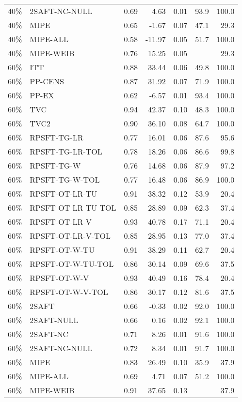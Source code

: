 \begin{table}[ht]
{\begin{tabular}{llrrrrr}
  40\% & 2SAFT-NC-NULL & 0.69 & 4.63 & 0.01 & 93.9 & 100.0 \\ 
  40\% & MIPE & 0.65 & -1.67 & 0.07 & 47.1 & 29.3 \\ 
  40\% & MIPE-ALL & 0.58 & -11.97 & 0.05 & 51.7 & 100.0 \\ 
  40\% & MIPE-WEIB & 0.76 & 15.25 & 0.05 &  & 29.3 \\ 
   \hline
60\% & ITT & 0.88 & 33.44 & 0.06 & 49.8 & 100.0 \\ 
  60\% & PP-CENS & 0.87 & 31.92 & 0.07 & 71.9 & 100.0 \\ 
  60\% & PP-EX & 0.62 & -6.57 & 0.01 & 93.4 & 100.0 \\ 
  60\% & TVC & 0.94 & 42.37 & 0.10 & 48.3 & 100.0 \\ 
  60\% & TVC2 & 0.90 & 36.10 & 0.08 & 64.7 & 100.0 \\ 
   \hline
60\% & RPSFT-TG-LR & 0.77 & 16.01 & 0.06 & 87.6 & 95.6 \\ 
  60\% & RPSFT-TG-LR-TOL & 0.78 & 18.26 & 0.06 & 86.6 & 99.8 \\ 
  60\% & RPSFT-TG-W & 0.76 & 14.68 & 0.06 & 87.9 & 97.2 \\ 
  60\% & RPSFT-TG-W-TOL & 0.77 & 16.48 & 0.06 & 86.9 & 100.0 \\ 
  60\% & RPSFT-OT-LR-TU & 0.91 & 38.32 & 0.12 & 53.9 & 20.4 \\ 
  60\% & RPSFT-OT-LR-TU-TOL & 0.85 & 28.89 & 0.09 & 62.3 & 37.4 \\ 
  60\% & RPSFT-OT-LR-V & 0.93 & 40.78 & 0.17 & 71.1 & 20.4 \\ 
  60\% & RPSFT-OT-LR-V-TOL & 0.85 & 28.95 & 0.13 & 77.0 & 37.4 \\ 
   \hline
60\% & RPSFT-OT-W-TU & 0.91 & 38.29 & 0.11 & 62.7 & 20.4 \\ 
  60\% & RPSFT-OT-W-TU-TOL & 0.86 & 30.14 & 0.09 & 69.6 & 37.5 \\ 
  60\% & RPSFT-OT-W-V & 0.93 & 40.49 & 0.16 & 78.4 & 20.4 \\ 
  60\% & RPSFT-OT-W-V-TOL & 0.86 & 30.17 & 0.12 & 81.6 & 37.5 \\ 
   \hline
60\% & 2SAFT & 0.66 & -0.33 & 0.02 & 92.0 & 100.0 \\ 
  60\% & 2SAFT-NULL & 0.66 & 0.16 & 0.02 & 92.1 & 100.0 \\ 
  60\% & 2SAFT-NC & 0.71 & 8.26 & 0.01 & 91.6 & 100.0 \\ 
  60\% & 2SAFT-NC-NULL & 0.72 & 8.34 & 0.01 & 91.7 & 100.0 \\ 
  60\% & MIPE & 0.83 & 26.49 & 0.10 & 35.9 & 37.9 \\ 
  60\% & MIPE-ALL & 0.69 & 4.71 & 0.07 & 51.2 & 100.0 \\ 
  60\% & MIPE-WEIB & 0.91 & 37.65 & 0.13 &  & 37.9 \\ 
   \hline
\end{tabular}
}
\end{table}
